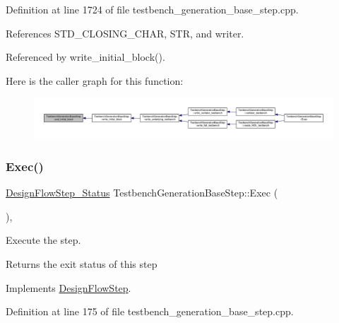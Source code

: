 Definition at line 1724 of file testbench\+\_\+generation\+\_\+base\+\_\+step.\+cpp.



References S\+T\+D\+\_\+\+C\+L\+O\+S\+I\+N\+G\+\_\+\+C\+H\+AR, S\+TR, and writer.



Referenced by write\+\_\+initial\+\_\+block().

Here is the caller graph for this function\+:
\nopagebreak
\begin{figure}[H]
\begin{center}
\leavevmode
\includegraphics[width=350pt]{dc/d02/classTestbenchGenerationBaseStep_a3e753eed3a77b2340fb97e257f2ba820_icgraph}
\end{center}
\end{figure}
\mbox{\label{classTestbenchGenerationBaseStep_a81cdc7a419f3795b97b205cc8ac28e97}} 
\subsubsection{\texorpdfstring{Exec()}{Exec()}}
{\footnotesize\ttfamily \hyperlink{design__flow__step_8hpp_afb1f0d73069c26076b8d31dbc8ebecdf}{Design\+Flow\+Step\+\_\+\+Status} Testbench\+Generation\+Base\+Step\+::\+Exec (\begin{DoxyParamCaption}{ }\end{DoxyParamCaption})\hspace{0.3cm}{\ttfamily [override]}, {\ttfamily [virtual]}}



Execute the step. 

\begin{DoxyReturn}{Returns}
the exit status of this step 
\end{DoxyReturn}


Implements \hyperlink{classDesignFlowStep_a77d7e38493016766098711ea24f60b89}{Design\+Flow\+Step}.



Definition at line 175 of file testbench\+\_\+generation\+\_\+base\+\_\+step.\+cpp.



